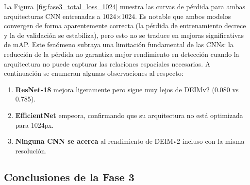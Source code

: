 La Figura~\ref{fig:fase3_total_loss_1024} muestra las curvas de pérdida para ambas arquitecturas CNN entrenadas a 1024$\times$1024. Es notable que ambos modelos convergen de forma aparentemente correcta (la pérdida de entrenamiento decrece y la de validación se estabiliza), pero esto no se traduce en mejoras significativas de mAP. Este fenómeno subraya una limitación fundamental de las CNNs: la reducción de la pérdida no garantiza mejor rendimiento en detección cuando la arquitectura no puede capturar las relaciones espaciales necesarias. A continuación se enumeran algunas observaciones al respecto:
\begin{enumerate}
    \item \textbf{ResNet-18} mejora ligeramente pero sigue muy lejos de DEIMv2 (0.080 vs 0.785).
    \item \textbf{EfficientNet} empeora, confirmando que su arquitectura no está optimizada para 1024px.
    \item \textbf{Ninguna CNN se acerca} al rendimiento de DEIMv2 incluso con la misma resolución.
\end{enumerate}

\subsection{Conclusiones de la Fase 3}

